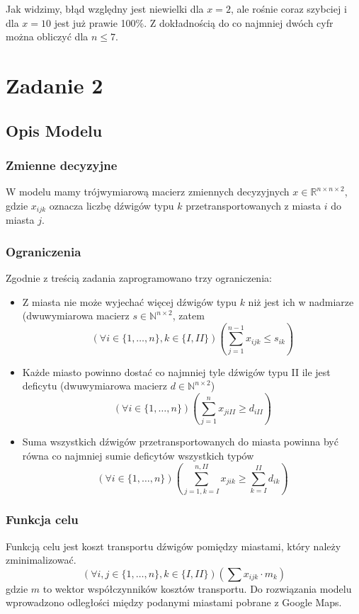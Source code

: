\documentclass{article}
\begin{document}
Jak widzimy, błąd względny jest niewielki dla $x=2$, ale rośnie coraz szybciej i dla $x=10$ jest już prawie 100\%. Z dokładnością do co najmniej dwóch cyfr można obliczyć dla $n \leq 7$.

\section{Zadanie 2}
\subsection{Opis Modelu}
\subsubsection{Zmienne decyzyjne}
W modelu mamy trójwymiarową macierz zmiennych decyzyjnych $x \in \mathbb{R}^{n\times n\times 2}$, gdzie $x_{ijk}$ oznacza liczbę dźwigów typu $k$ przetransportowanych z miasta $i$ do miasta $j$.
\subsubsection{Ograniczenia}
Zgodnie z treścią zadania zaprogramowano trzy ograniczenia:
\begin{itemize}
	\item Z miasta nie może wyjechać więcej dźwigów typu $k$ niż jest ich w nadmiarze (dwuwymiarowa macierz $s \in \mathbb{N}^{n\times 2}$, zatem
	\[(\forall i \in \{1,\dots,n\}, k \in \{I,II\}) \left(\sum_{j=1}^{n-1}{x_{ijk} \leq s_{ik}}\right)\]
	\item Każde miasto powinno dostać co najmniej tyle dźwigów typu II ile jest deficytu (dwuwymiarowa macierz $d \in \mathbb{N}^{n\times 2}$)
	\[(\forall i \in \{1,\dots,n\}) \left(\sum_{j=1}^{n}{x_{jiII} \geq d_{iII}}\right)\]
	\item Suma wszystkich dźwigów przetransportowanych do miasta powinna być równa co najmniej sumie deficytów wszystkich typów
	\[(\forall i \in \{1,\dots,n\}) \left(\sum_{j=1,k=I}^{n,II}{x_{jik}} \geq \sum_{k=I}^{II}{d_{ik}}\right)\]
\end{itemize}
\subsubsection{Funkcja celu}
Funkcją celu jest koszt transportu dźwigów pomiędzy miastami, który należy zminimalizować. 
\[(\forall i,j \in \{1,\dots,n\}, k \in \{I,II\}) \left(\sum{x_{ijk} \cdot m_k}\right)\]
gdzie $m$ to wektor współczynników kosztów transportu.
Do rozwiązania modelu wprowadzono odległości między podanymi miastami pobrane z Google Maps.
\end{document}
